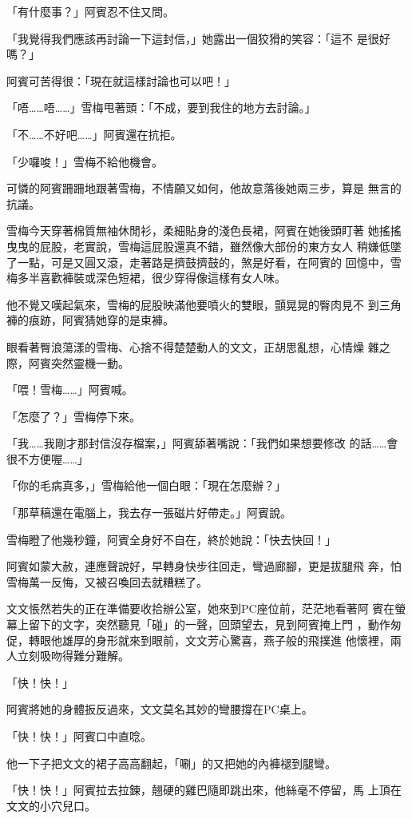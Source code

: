「有什麼事？」阿賓忍不住又問。

「我覺得我們應該再討論一下這封信，」她露出一個狡猾的笑容：「這不
是很好嗎？」

阿賓可苦得很：「現在就這樣討論也可以吧！」

「唔……唔……」雪梅甩著頭：「不成，要到我住的地方去討論。」

「不……不好吧……」阿賓還在抗拒。

「少囉唆！」雪梅不給他機會。

可憐的阿賓跚跚地跟著雪梅，不情願又如何，他故意落後她兩三步，算是
無言的抗議。

雪梅今天穿著棉質無袖休閒衫，柔細貼身的淺色長裙，阿賓在她後頭盯著
她搖搖曳曳的屁股，老實說，雪梅這屁股還真不錯，雖然像大部份的東方女人
稍嫌低墜了一點，可是又圓又滾，走著路是擠鼓擠鼓的，煞是好看，在阿賓的
回憶中，雪梅多半喜歡褲裝或深色短裙，很少穿得像這樣有女人味。

他不覺又嘆起氣來，雪梅的屁股映滿他要噴火的雙眼，顫晃晃的臀肉見不
到三角褲的痕跡，阿賓猜她穿的是束褲。

眼看著臀浪蕩漾的雪梅、心捨不得楚楚動人的文文，正胡思亂想，心情燥
雜之際，阿賓突然靈機一動。

「喂！雪梅……」阿賓喊。

「怎麼了？」雪梅停下來。

「我……我剛才那封信沒存檔案，」阿賓舔著嘴說：「我們如果想要修改
的話……會很不方便喔……」

「你的毛病真多，」雪梅給他一個白眼：「現在怎麼辦？」

「那草稿還在電腦上，我去存一張磁片好帶走。」阿賓說。

雪梅瞪了他幾秒鐘，阿賓全身好不自在，終於她說：「快去快回！」

阿賓如蒙大赦，連應聲說好，早轉身快步往回走，彎過廊腳，更是拔腿飛
奔，怕雪梅萬一反悔，又被召喚回去就糟糕了。

文文悵然若失的正在準備要收拾辦公室，她來到PC座位前，茫茫地看著阿
賓在螢幕上留下的文字，突然聽見「碰」的一聲，回頭望去，見到阿賓掩上門
，動作匆促，轉眼他雄厚的身形就來到眼前，文文芳心驚喜，燕子般的飛撲進
他懷裡，兩人立刻吸吻得難分難解。

「快！快！」

阿賓將她的身體扳反過來，文文莫名其妙的彎腰撐在PC桌上。

「快！快！」阿賓口中直唸。

他一下子把文文的裙子高高翻起，「唰」的又把她的內褲褪到腿彎。

「快！快！」阿賓拉去拉鍊，翹硬的雞巴隨即跳出來，他絲毫不停留，馬
上頂在文文的小穴兒口。

